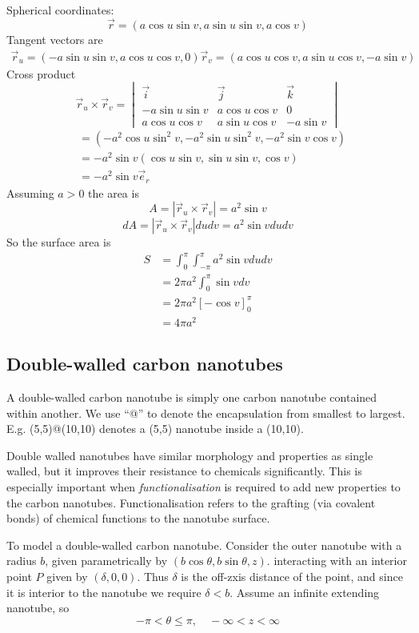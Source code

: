 \documentclass{E:/Documents/Latex/myassignment}
\begin{document}
Spherical coordinates:
\[\vec r = (a\cos u\sin v, a\sin u \sin v, a \cos v)\]
Tangent vectors are
\begin{align*}
	\vec r_u = (-a\sin u \sin v, a\cos u \cos v, 0) 
	\vec r_v = (a\cos u \cos v, a\sin u \cos v, -a\sin v)
\end{align*}
Cross product
\[\vec r_u \times \vec r_v = \begin{vmatrix}
	\vec i&\vec j&\vec k\\
	-a\sin u \sin v& a\cos u \cos v& 0\\
	a\cos u \cos v& a\sin u \cos v& -a\sin v
\end{vmatrix} \]
\begin{align*}
	&= (-a^2\cos u \sin^2 v, -a^2 \sin u \sin^2 v, -a^2 \sin v \cos v)\\
	&=  -a^2\sin v(\cos u \sin v, \sin u \sin v, \cos v)\\
	&= -a^2\sin v \vec e_r
\end{align*}
Assuming $a > 0$ the area is
\[A = |\vec r_u \times \vec r_v| = a^2\sin v\]
\[dA = |\vec r_u \times \vec r_v |dudv  = a^2 \sin v du dv \]
So the surface area is
\begin{align*}
	S&= \int_0^\pi \int_{-\pi}^{\pi} a^2\sin v du dv\\
	&= 2\pi a^2 \int_0^\pi \sin v dv\\
	&= 2\pi a^2 [-\cos v]_0^\pi\\
	&= 4\pi a^2
\end{align*}


\subsection{Double-walled carbon nanotubes}
A double-walled carbon nanotube is simply one carbon nanotube contained within another.
We use ``@'' to denote the encapsulation from smallest to largest. E.g. (5,5)@(10,10) denotes a (5,5) nanotube inside a (10,10).

Double walled nanotubes have similar morphology and properties as single walled, but it improves their resistance to chemicals significantly. This is especially important when \textit{functionalisation} is required to add new properties to the carbon nanotubes.
Functionalisation refers to the grafting (via covalent bonds) of chemical functions to the nanotube surface.


To model a double-walled carbon nanotube. Consider the outer nanotube with a radius $b$, given parametrically by $(b\cos \theta, b\sin \theta, z)$. interacting with an interior point $P$ given by $(\delta,0,0)$. Thus $\delta$ is the off-zxis distance of the point, and since it is interior to the nanotube we require $\delta <b$. Assume an infinite extending nanotube, so
\[-\pi < \theta \leq \pi, \quad -\infty < z < \infty\]
\end{document}
